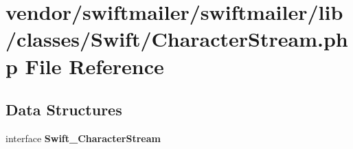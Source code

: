 \section{vendor/swiftmailer/swiftmailer/lib/classes/\+Swift/\+Character\+Stream.php File Reference}
\label{_character_stream_8php}
\subsection*{Data Structures}
\begin{DoxyCompactItemize}
\item 
interface {\bf Swift\+\_\+\+Character\+Stream}
\end{DoxyCompactItemize}
